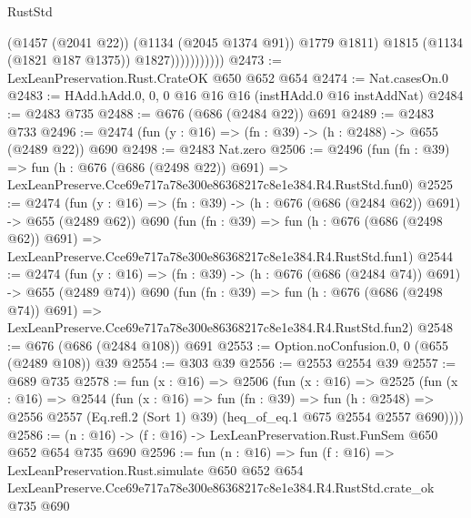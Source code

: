 \begin{lexlean}{RustStd}
\begin{coremodule}
                            (@1457 (@2041 @22))
                            (@1134 (@2045 @1374 @91))
                            @1779
                            @1811)
                          @1815
                          (@1134 (@1821 @187 @1375))
                          @1827)))))))))))
@2473 := LexLeanPreservation.Rust.CrateOK @650 @652 @654
@2474 := Nat.casesOn.{0}
@2483 := HAdd.hAdd.{0, 0, 0} @16 @16 @16 (instHAdd.{0} @16 instAddNat)
@2484 := @2483 @735
@2488 := @676 (@686 (@2484 @22)) @691
@2489 := @2483 @733
@2496 := @2474 (fun (y : @16) => (fn : @39) -> (h : @2488) -> @655 (@2489 @22)) @690
@2498 := @2483 Nat.zero
@2506 := @2496
    (fun (fn : @39) =>
    fun (h : @676 (@686 (@2498 @22)) @691) =>
    LexLeanPreserve.Cce69e717a78e300e86368217c8e1e384.R4.RustStd.fun0)
@2525 := @2474
    (fun (y : @16) => (fn : @39) -> (h : @676 (@686 (@2484 @62)) @691) -> @655 (@2489 @62))
    @690
    (fun (fn : @39) =>
    fun (h : @676 (@686 (@2498 @62)) @691) =>
    LexLeanPreserve.Cce69e717a78e300e86368217c8e1e384.R4.RustStd.fun1)
@2544 := @2474
    (fun (y : @16) => (fn : @39) -> (h : @676 (@686 (@2484 @74)) @691) -> @655 (@2489 @74))
    @690
    (fun (fn : @39) =>
    fun (h : @676 (@686 (@2498 @74)) @691) =>
    LexLeanPreserve.Cce69e717a78e300e86368217c8e1e384.R4.RustStd.fun2)
@2548 := @676 (@686 (@2484 @108)) @691
@2553 := Option.noConfusion.{0, 0} (@655 (@2489 @108)) @39
@2554 := @303 @39
@2556 := @2553 @2554 @39
@2557 := @689 @735
@2578 := fun (x : @16) =>
  @2506
    (fun (x : @16) =>
    @2525
      (fun (x : @16) =>
      @2544
        (fun (x : @16) =>
        fun (fn : @39) =>
        fun (h : @2548) =>
        @2556 @2557 (Eq.refl.{2} (Sort 1) @39) (heq_of_eq.{1} @675 @2554 @2557 @690))))
@2586 := (n : @16) -> (f : @16) -> LexLeanPreservation.Rust.FunSem @650 @652 @654 @735 @690
@2596 := fun (n : @16) =>
  fun (f : @16) =>
  LexLeanPreservation.Rust.simulate
    @650
    @652
    @654
    LexLeanPreserve.Cce69e717a78e300e86368217c8e1e384.R4.RustStd.crate_ok
    @735
    @690
\end{coremodule}
\end{lexlean}
